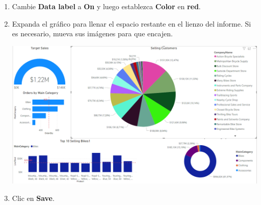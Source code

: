 \documentclass[12pt,letterpaper]{article}
\newcommand\tab[1][1cm]{\hspace*{#1}}
\begin{document}
\begin{enumerate}[\tab 1.]
        \item Cambie \textbf{Data label} a \textbf{On} y luego establezca \textbf{Color} en \textbf{red}.
        \item Expanda el gráfico para llenar el espacio restante en el lienzo del informe. Si es necesario, mueva sus imágenes para que encajen.
        \begin{center}
            \includegraphics[width=13cm]{./img/img117.png}
        \end{center}
        \item Clic en \textbf{Save}.
    \end{enumerate}
    
\end{document}
